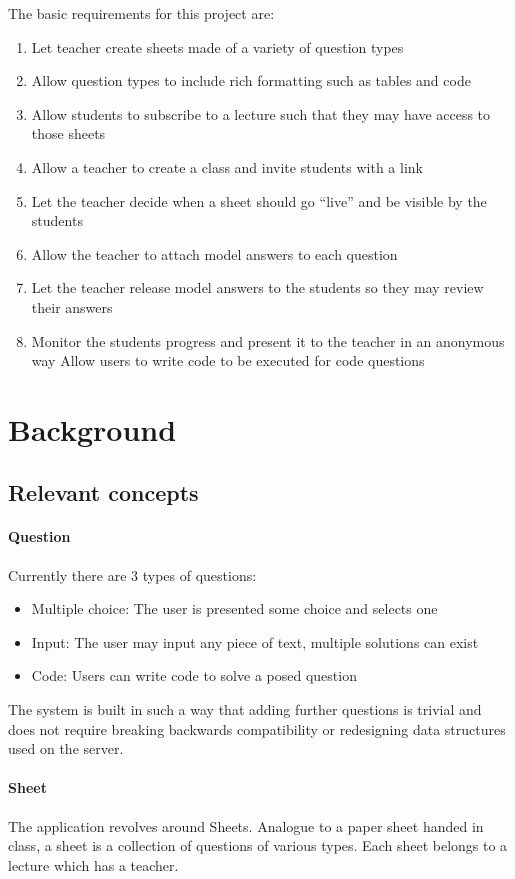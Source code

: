 \documentclass[12pt]{article}
\begin{document}
The basic requirements for this project are:
\begin{enumerate}
\item Let teacher create sheets made of a variety of question types
\item 	Allow question types to include rich formatting such as tables and code
\item 	Allow students to subscribe to a lecture such that they may have access to those sheets
\item 	Allow a teacher to create a class and invite students with a link
\item 	Let the teacher decide when a sheet should go “live” and be visible by the students
\item 	Allow the teacher to attach model answers to each question
\item Let the teacher release model answers to the students so they may review their answers
\item 	Monitor the students progress and present it to the teacher in an anonymous way
Allow users to write code to be executed for code questions

\end{enumerate}

\section{Background}
\subsection{Relevant concepts}
\paragraph{Question}
Currently there are 3 types of questions:
\begin{itemize}
\item Multiple choice: The user is presented some choice and selects one
\item Input: The user may input any piece of text, multiple solutions can exist
\item Code: Users can write code to solve a posed question
\end{itemize}

The system is built in such a way that adding further questions is trivial and does not require breaking backwards compatibility or redesigning data structures used on the server.

\paragraph{Sheet}
The application revolves around Sheets. Analogue to a paper sheet handed in class, a sheet is a collection of questions of various types. Each sheet belongs to a lecture which has a teacher.
\end{document}
